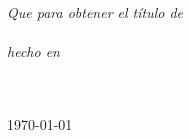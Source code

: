 \documentclass[
11pt, %
spanish, %
singlespacing, %
headsepline, %
]{MastersDoctoralThesis} %
\begin{document}
\begin{titlepage}
\begin{center}
\large \textit{Que para obtener el título de\\ \degreename}\\[0.3cm] %
\textit{hecho en}\\[0.4cm]
\groupname\\\deptname\\[2cm] %
 
\vfill

{\large \today}\\[4cm] %
 
\vfill
\end{center}
\end{titlepage}

\end{document}
